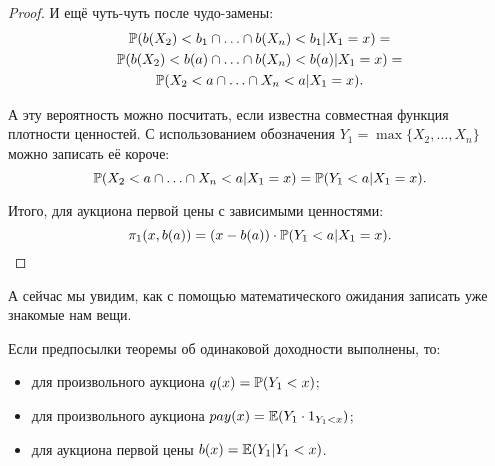 \begin{proof}
И ещё чуть-чуть после чудо-замены:
\begin{multline}
\P(b(X_{2})<b_{1}\cap \ldots \cap b(X_{n})<b_{1}|X_{1}=x)=\\
\P(b(X_{2})<b(a)\cap \ldots \cap b(X_{n})<b(a)|X_{1}=x)=\\
\P(X_{2}<a\cap \ldots \cap X_{n}<a|X_{1}=x).
\end{multline}

А эту вероятность можно посчитать, если известна совместная функция плотности ценностей. С использованием обозначения $ Y_{1}=\max\{X_{2},\ldots, X_{n}\} $ можно записать её короче:
\begin{equation}
\P(X_{2}<a\cap \ldots \cap X_{n}<a|X_{1}=x)=\P(Y_{1}<a|X_{1}=x).
\end{equation}

Итого, для аукциона первой цены с зависимыми ценностями:
\begin{equation}
\pi_{1}(x,b(a))=(x-b(a))\cdot \P(Y_{1}<a|X_{1}=x).
\end{equation}
\end{proof}

А сейчас мы увидим, как с помощью математического ожидания записать уже знакомые нам вещи.

\begin{myth} Если предпосылки теоремы об одинаковой доходности выполнены, то:
\label{probabilistic_interpretation}
\begin{itemize}
\item для произвольного аукциона $ q(x)=\P(Y_{1}<x) $;
\item для произвольного аукциона $ pay(x)=\E(Y_{1}\cdot 1_{Y_{1}<x}) $;
\item для аукциона первой цены $ b(x)=\E(Y_{1}|Y_{1}<x) $.
\end{itemize}
\end{myth}

